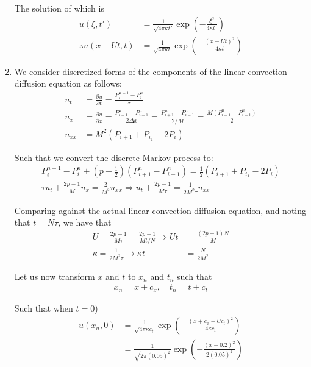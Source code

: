 \begin{enumerate}[label=(\roman*),leftmargin=*,itemsep=0mm]
    The solution of which is
    \begin{align*}
        u(\xi,t') &= \frac{1}{\sqrt{4\pi\kappa t'}}\exp(-\frac{\xi^2}{4\kappa t'}) \\
        \therefore u(x-Ut,t) &= \frac{1}{\sqrt{4\pi\kappa t}}\exp(-\frac{(x-Ut)^2}{4\kappa t})
    \end{align*}
    
    \item We consider discretized forms of the components of the linear convection-diffusion equation as follows:
    \begin{align*}
        u_t &= \frac{\partial u}{\partial t} = \frac{P_i^{n+1} - P_i^n}{\tau} \\
        u_x &= \frac{\partial u}{\partial x} = \frac{P_{i+1}^n - P_{i-1}^n}{2\Delta x} 
        = \frac{P_{i+1}^n - P_{i-1}^n}{2/M} = \frac{M(P_{i+1}^n - P_{i-1}^n)}{2} \\
        u_{xx} &= M^2(P_{i+1}+P_{i_1}-2P_i)
    \end{align*}
    
    Such that we convert the discrete Markov process to:
    \begin{gather*}
        P_i^{n+1} - P_i^n + \left(p-\frac{1}{2}\right)(P_{i+1}^n-P_{i-1}^n)
        = \frac{1}{2}(P_{i+1}+P_{i_1}-2P_i) \\
        \tau u_t + \frac{2p-1}{M} u_x = \frac{2}{M^2}u_{xx} \Rightarrow u_t + \frac{2p-1}{M\tau} = \frac{1}{2M^2\tau}u_{xx}
    \end{gather*}
    
    Comparing against the actual linear convection-diffusion equation, and noting that $t = N\tau$, we have that
    \begin{align*}
        U = \frac{2p-1}{M\tau} = \frac{2p-1}{Mt/N} \Rightarrow Ut &= \frac{(2p-1)N}{M} \\
        \kappa = \frac{1}{2M^2\tau} \rightarrow \kappa t &= \frac{N}{2M^2}
    \end{align*}
    
    Let us now transform $x$ and $t$ to $x_n$ and $t_n$ such that
    \begin{align*}
        x_n = x + c_x, \quad
        t_n = t + c_t
    \end{align*}
    
    Such that when $t=0$)
    \begin{align*}
        u(x_n,0) &= \frac{1}{\sqrt{4\pi\kappa c_t}}
        \exp(-\frac{(x+c_x-Uc_t)^2}{4\kappa c_t}) \\
        &= \frac{1}{\sqrt{2\pi(0.05)^2}}
        \exp(-\frac{(x-0.2)^2}{2(0.05)^2})
    \end{align*}
    

\end{enumerate}
